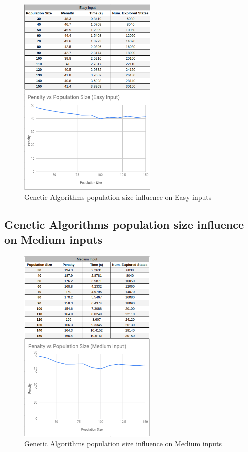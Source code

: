 \documentclass[conference]{IEEEtran}
\begin{document}
\begin{figure}[H]
    \centerline{\includegraphics[width=250px]{genetic_pop_size_easy.png}}
    \caption{Genetic Algorithms population size influence on Easy inputs}
\end{figure}

\subsection{Genetic Algorithms population size influence on Medium inputs}

\begin{figure}[H]
    \centerline{\includegraphics[width=250px]{genetic_pop_size_medium.png}}
    \caption{Genetic Algorithms population size influence on Medium inputs}
\end{figure}
\end{document}
